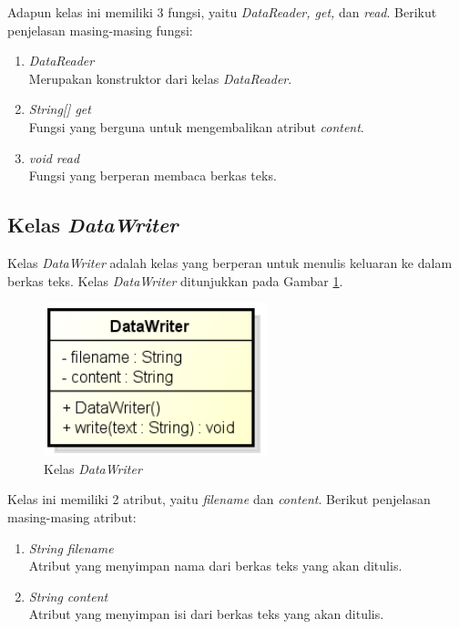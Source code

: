 Adapun kelas ini memiliki 3 fungsi, yaitu \textit{DataReader, get,} dan \textit{read}. Berikut penjelasan masing-masing fungsi:

\begin{enumerate}
	\item \textit{DataReader} \\
	Merupakan konstruktor dari kelas \textit{DataReader}.
	\item \textit{String[] get} \\
	Fungsi yang berguna untuk mengembalikan atribut \textit{content}.
	\item \textit{void read} \\
	Fungsi yang berperan membaca berkas teks.
\end{enumerate}

\subsection{Kelas \textit{DataWriter}}

Kelas \textit{DataWriter} adalah kelas yang berperan untuk menulis keluaran ke dalam berkas teks. Kelas \textit{DataWriter} ditunjukkan pada Gambar \ref{fig:classdatawriter}.

\begin{figure}[H]
	\centering
	\includegraphics[scale=0.8]{Gambar/class_data_writer}
	\caption{Kelas \textit{DataWriter}}\label{fig:classdatawriter}
\end{figure}

Kelas ini memiliki 2 atribut, yaitu \textit{filename} dan \textit{content}. Berikut penjelasan masing-masing atribut:

\begin{enumerate}
	\item \textit{String filename} \\
	Atribut yang menyimpan nama dari berkas teks yang akan ditulis.
	\item \textit{String content} \\
	Atribut yang menyimpan isi dari berkas teks yang akan ditulis.
\end{enumerate}

